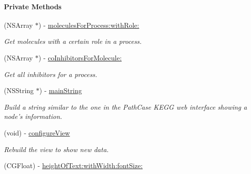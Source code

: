 \begin{Indent}\paragraph*{Private Methods}
\begin{DoxyCompactItemize}
\item 
\hypertarget{interface_p_c_node_info_view_controller_a2372d8511c7b06948d0387ddda1c4044}{
(NSArray $\ast$) -\/ \hyperlink{interface_p_c_node_info_view_controller_a2372d8511c7b06948d0387ddda1c4044}{moleculesForProcess:withRole:}}
\label{interface_p_c_node_info_view_controller_a2372d8511c7b06948d0387ddda1c4044}

\begin{DoxyCompactList}\small\item\em Get molecules with a certain role in a process. \end{DoxyCompactList}\item 
\hypertarget{interface_p_c_node_info_view_controller_aaceef7c95fed7b385b6c1f02deb8deca}{
(NSArray $\ast$) -\/ \hyperlink{interface_p_c_node_info_view_controller_aaceef7c95fed7b385b6c1f02deb8deca}{coInhibitorsForMolecule:}}
\label{interface_p_c_node_info_view_controller_aaceef7c95fed7b385b6c1f02deb8deca}

\begin{DoxyCompactList}\small\item\em Get all inhibitors for a process. \end{DoxyCompactList}\item 
\hypertarget{interface_p_c_node_info_view_controller_a18727e55e75b11ea27ff9975ca1d12e1}{
(NSString $\ast$) -\/ \hyperlink{interface_p_c_node_info_view_controller_a18727e55e75b11ea27ff9975ca1d12e1}{mainString}}
\label{interface_p_c_node_info_view_controller_a18727e55e75b11ea27ff9975ca1d12e1}

\begin{DoxyCompactList}\small\item\em Build a string similar to the one in the PathCase KEGG web interface showing a node's information. \end{DoxyCompactList}\item 
\hypertarget{interface_p_c_node_info_view_controller_adbb43b74efe5b1f2cdaa47b0a841aedb}{
(void) -\/ \hyperlink{interface_p_c_node_info_view_controller_adbb43b74efe5b1f2cdaa47b0a841aedb}{configureView}}
\label{interface_p_c_node_info_view_controller_adbb43b74efe5b1f2cdaa47b0a841aedb}

\begin{DoxyCompactList}\small\item\em Rebuild the view to show new data. \end{DoxyCompactList}\item 
\hypertarget{interface_p_c_node_info_view_controller_a9ccd476c8644ff1b8300d8b3e1409a77}{
(CGFloat) -\/ \hyperlink{interface_p_c_node_info_view_controller_a9ccd476c8644ff1b8300d8b3e1409a77}{heightOfText:withWidth:fontSize:}}
\label{interface_p_c_node_info_view_controller_a9ccd476c8644ff1b8300d8b3e1409a77}


\end{DoxyCompactItemize}
\end{Indent}
